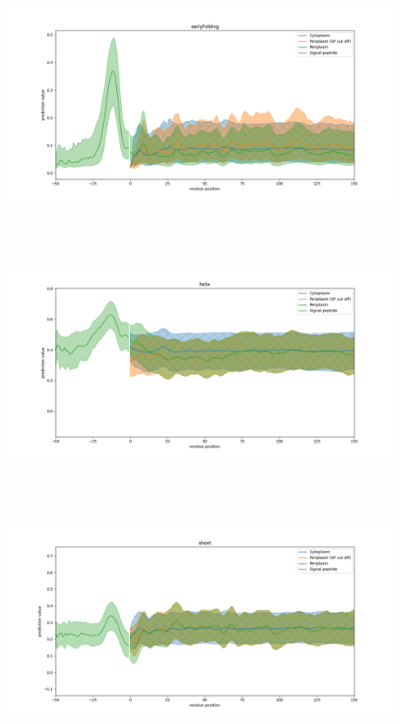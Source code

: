~\begin{figure}[h!]
	\includegraphics[width=\linewidth]
	{./results/general_comparison/img/earlyFolding.png}
~\end{figure}

~\begin{figure}[h!]
	\includegraphics[width=\linewidth]
	{./results/general_comparison/img/helix.png}
~\end{figure}

~\begin{figure}[h!]
	\includegraphics[width=\linewidth]
	{./results/general_comparison/img/sheet.png}
~\end{figure}

